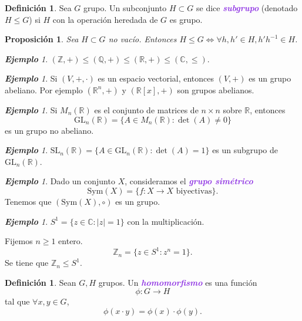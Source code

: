 \documentclass{article}
\newtheorem{proposition}[theorem]{Proposición}
\theoremstyle{definition}
\newtheorem{definition}[theorem]{Definición}
\theoremstyle{remark}
\newtheorem{example}[theorem]{\textbf{Ejemplo}}
\numberwithin{equation}{section}
\newcommand{\C}{\mathbb{C}}
\newcommand{\Q}{\mathbb{Q}}
\newcommand{\R}{\mathbb{R}}
\newcommand{\Z}{\mathbb{Z}}
\renewcommand{\c}{\cdot}
\newcommand{\GL}{\mathrm{GL}}
\newcommand{\SL}{\mathrm{SL}}
\newcommand{\Sym}{\mathrm{Sym}}
\newcommand{\wea}[1]{\textcolor{BlueViolet}{\textbf{\emph{#1}}}}
\begin{document}
\begin{definition}
  Sea $G$ grupo. Un subconjunto $H \subset G$ se dice \wea{subgrupo} (denotado $H \leqslant G$) si $H$ con la operación heredada de $G$ es grupo.
\end{definition}

\begin{proposition}
  Sea $H \subset G$ no vacío. Entonces $H \leqslant G \iff \forall h,h' \in H, h'h^{-1} \in H$.
\end{proposition}

\begin{example}
  $(\Z,+) \leqslant (\Q,+) \leqslant (\R,+) \leqslant (\C,\leqslant)$.
\end{example}

\begin{example}
  Si $(V,+,\cdot)$ es un espacio vectorial, entonces $(V,+)$ es un grupo abeliano. Por ejemplo $(\R^n,+)$ y $(\R[x],+)$ son grupos abelianos.
\end{example}

\begin{example}
  Si $M_n(\R)$ es el conjunto de matrices de $n \times n$ sobre $\R$, entonces
  \[\GL_n(\R) = \{A \in M_n(\R) \colon \det(A) \neq 0\}\]
  es un grupo no abeliano.
\end{example}

\begin{example}
  $\SL_n(\R) = \{A \in \GL_n(\R) \colon \det(A) = 1\}$ es un subgrupo de $\GL_n(\R)$.
\end{example}

\begin{example}
  Dado un conjunto $X$, consideramos el \wea{grupo simétrico}
  \[\Sym(X) = \{f \colon X \to X \text{ biyectivas}\}.\]
  Tenemos que $(\Sym(X),\circ)$ es un grupo.
\end{example}

\begin{example}
  $S^1 = \{z \in \C \colon |z| = 1\}$ con la multiplicación.

  Fijemos $n \geq 1$ entero.
  \[\Z_n = \{z \in S^1 \colon z^n = 1\}.\]
  Se tiene que $\Z_n \leqslant S^1$.
\end{example}

\begin{definition}
  Sean $G,H$ grupos. Un \wea{homomorfismo} es una función $$\phi \colon G \to H$$ tal que $\forall x, y \in G$, $$\phi(x\c y) = \phi(x) \c \phi(y).$$
\end{definition}
\end{document}
